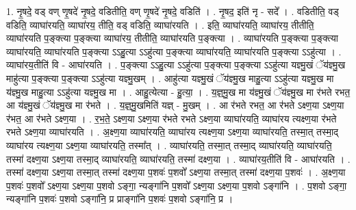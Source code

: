 \documentclass[17pt]{extarticle}
\begin{document}
1. नृ॒षदे॒ वड् वण् णृ॒षदे॑ नृ॒षदे॒ वडितीति॒ वण् णृ॒षदे॑ नृ॒षदे॒ वडिति॑ । . नृ॒षद॒ इति॑ नृ - सदे᳚ । . वडितीति॒ वड् वडिति॒ व्याघा॑रयति॒ व्याघा॑रय॒ तीति॒ वड् वडिति॒ व्याघा॑रयति । . इति॒ व्याघा॑रयति॒ व्याघा॑रय॒ तीतीति॒ व्याघा॑रयति प॒ङ्क्त्या प॒ङ्क्त्या व्याघा॑रय॒ तीतीति॒ व्याघा॑रयति प॒ङ्क्त्या । . व्याघा॑रयति प॒ङ्क्त्या प॒ङ्क्त्या व्याघा॑रयति॒ व्याघा॑रयति प॒ङ्क्त्या ऽऽहु॒त्या ऽऽहु॑त्या प॒ङ्क्त्या व्याघा॑रयति॒ व्याघा॑रयति प॒ङ्क्त्या ऽऽहु॑त्या । . व्याघा॑रय॒तीति॑ वि - आघा॑रयति । . प॒ङ्क्त्या ऽऽहु॒त्या ऽऽहु॑त्या प॒ङ्क्त्या प॒ङ्क्त्या ऽऽहु॑त्या यज्ञ्मु॒खं ॅय॑ज्ञ्मु॒ख माहु॑त्या प॒ङ्क्त्या प॒ङ्क्त्या ऽऽहु॑त्या यज्ञ्मु॒खम् । . आहु॑त्या यज्ञ्मु॒खं ॅय॑ज्ञ्मु॒ख माहु॒त्या ऽऽहु॑त्या यज्ञ्मु॒ख मा य॑ज्ञ्मु॒ख माहु॒त्या ऽऽहु॑त्या यज्ञ्मु॒ख मा । . आहु॒त्येत्या - हु॒त्या॒ । . य॒ज्ञ्॒मु॒ख मा य॑ज्ञ्मु॒खं ॅय॑ज्ञ्मु॒ख मा र॑भते रभत॒ आ य॑ज्ञ्मु॒खं ॅय॑ज्ञ्मु॒ख मा र॑भते । . य॒ज्ञ्॒मु॒खमिति॑ यज्ञ् - मु॒खम् । . आ र॑भते रभत॒ आ र॑भते ऽक्ष्ण॒या ऽक्ष्ण॒या र॑भत॒ आ र॑भते ऽक्ष्ण॒या । . र॒भ॒ते॒ ऽक्ष्ण॒या ऽक्ष्ण॒या र॑भते रभते ऽक्ष्ण॒या व्याघा॑रयति॒ व्याघा॑रय त्यक्ष्ण॒या र॑भते रभते ऽक्ष्ण॒या व्याघा॑रयति । . अ॒क्ष्ण॒या व्याघा॑रयति॒ व्याघा॑रय त्यक्ष्ण॒या ऽक्ष्ण॒या व्याघा॑रयति॒ तस्मा॒त् तस्मा॒द् व्याघा॑रय त्यक्ष्ण॒या ऽक्ष्ण॒या व्याघा॑रयति॒ तस्मा᳚त् । . व्याघा॑रयति॒ तस्मा॒त् तस्मा॒द् व्याघा॑रयति॒ व्याघा॑रयति॒ तस्मा॑ दक्ष्ण॒या ऽक्ष्ण॒या तस्मा॒द् व्याघा॑रयति॒ व्याघा॑रयति॒ तस्मा॑ दक्ष्ण॒या । . व्याघा॑रय॒तीति॑ वि - आघा॑रयति । . तस्मा॑ दक्ष्ण॒या ऽक्ष्ण॒या तस्मा॒त् तस्मा॑ दक्ष्ण॒या प॒शवः॑ प॒शवो᳚ ऽक्ष्ण॒या तस्मा॒त् तस्मा॑ दक्ष्ण॒या प॒शवः॑ । . अ॒क्ष्ण॒या प॒शवः॑ प॒शवो᳚ ऽक्ष्ण॒या ऽक्ष्ण॒या प॒शवो ऽङ्गा॒ न्यङ्गा॑नि प॒शवो᳚ ऽक्ष्ण॒या ऽक्ष्ण॒या प॒शवो ऽङ्गा॑नि । . प॒शवो ऽङ्गा॒ न्यङ्गा॑नि प॒शवः॑ प॒शवो ऽङ्गा॑नि॒ प्र प्राङ्गा॑नि प॒शवः॑ प॒शवो ऽङ्गा॑नि॒ प्र । \newline
\end{document}
